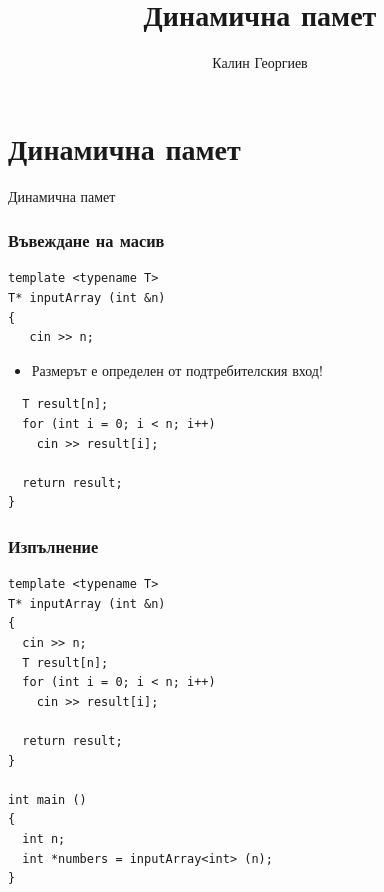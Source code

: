 \documentclass{beamer}
\begin{document}
\title[Обектно ориентирано програмиране]{Динамична памет} 
\author{Калин Георгиев} 
\frame{\titlepage} 

\section{Динамична памет} 


\begin{frame}
\centerline{Динамична памет}
\end{frame}


\begin{frame}[fragile]
\frametitle{Въвеждане на масив}

\begin{flushleft}
\begin{lstlisting}
template <typename T>
T* inputArray (int &n)
{ 
   cin >> n;
\end{lstlisting}  
\end{flushleft}

\begin{itemize}
  \item Размерът е определен от подтребителския вход!
\end{itemize}

\begin{flushleft}
\begin{lstlisting}
  T result[n];
  for (int i = 0; i < n; i++)
    cin >> result[i];

  return result;
}

\end{lstlisting}  
\end{flushleft}

 

\end{frame}


\begin{frame}[fragile]
\frametitle{Изпълнение}

\begin{flushleft}
\begin{lstlisting}
template <typename T>
T* inputArray (int &n)
{ 
  cin >> n;
  T result[n];
  for (int i = 0; i < n; i++)
    cin >> result[i];

  return result;
}

int main ()
{
  int n;
  int *numbers = inputArray<int> (n);
}

\end{lstlisting}  
\end{flushleft}

 

\end{frame}
\end{document}
